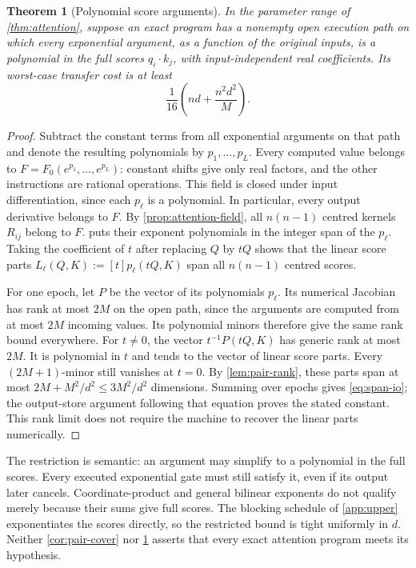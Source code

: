 \documentclass[11pt]{article}
\newtheorem{theorem}{Theorem}[section]
\theoremstyle{definition}
\theoremstyle{remark}
\begin{document}
\begin{theorem}[Polynomial score arguments]
\label{thm:score-exp}
In the parameter range of \cref{thm:attention}, suppose an exact
program has a nonempty open execution path on which every exponential
argument, as a function of the original inputs, is a polynomial in
the full scores $q_i\cdot k_j$, with input-independent real coefficients.
Its worst-case transfer cost is at least
\[
 \frac1{16}\left(nd+\frac{n^2d^2}{M}\right).
\]
\end{theorem}
\begin{proof}
Subtract the constant terms from all exponential arguments on that
path and denote the resulting polynomials by $p_1,\ldots,p_L$.
Every computed value belongs to
$F=F_0(e^{p_1},\ldots,e^{p_L})$: constant shifts give only real
factors, and the other instructions are rational operations.
This field is closed under input differentiation, since each $p_\ell$
is a polynomial. In particular, every output derivative belongs to
$F$. By \cref{prop:attention-field}, all $n(n-1)$ centred kernels
$R_{ij}$ belong to $F$.  puts their exponent
polynomials in the integer span of the $p_\ell$. Taking the coefficient
of $t$ after replacing $Q$ by $tQ$ shows that the linear score parts
$L_\ell(Q,K):=[t]p_\ell(tQ,K)$ span all $n(n-1)$ centred scores.

For one epoch, let $P$ be the vector of its polynomials $p_\ell$.
Its numerical Jacobian has rank at most $2M$ on the open path, since
the arguments are computed from at most $2M$ incoming values. Its
polynomial minors therefore give the same rank bound everywhere.
For $t\ne0$, the vector $t^{-1}P(tQ,K)$ has generic rank at most $2M$.
It is polynomial in $t$ and tends to the vector of linear score parts.
Every $(2M+1)$-minor still vanishes at $t=0$. By
\cref{lem:pair-rank}, these parts span at most
$2M+M^2/d^2\le3M^2/d^2$ dimensions. Summing over epochs gives
\cref{eq:span-io}; the output-store argument following that equation
proves the stated constant. This rank limit does not require the
machine to recover the linear parts numerically.
\end{proof}

The restriction is semantic: an argument may simplify to a polynomial
in the full scores. Every executed exponential gate must still satisfy
it, even if its output later cancels. Coordinate-product and general
bilinear exponents do not qualify merely because their sums give full
scores. The blocking schedule of \cref{app:upper} exponentiates the
scores directly, so the restricted bound is tight uniformly in $d$. Neither
\cref{cor:pair-cover} nor \cref{thm:score-exp} asserts that every exact
attention program meets its hypothesis.
\end{document}
